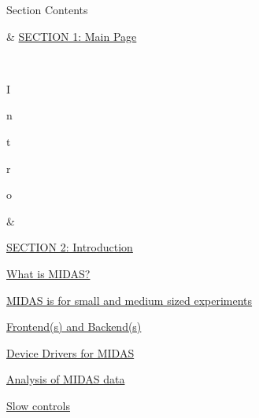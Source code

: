  \par
\par


\label{O_Contents_Page_Main_section_index}
\hypertarget{O_Contents_Page_Main_section_index}{}


\par
 \begin{TabularC}{2}
\hline
Section Contents   \\


\begin{TabularC}{2}
\hline
\par
 & \hyperlink{index_Top}{SECTION 1: Main Page} \par
  \\
 \par
\par
\par
I\par
n\par
t\par
r\par
o\par
   &\label{O_Contents_Page_Intro_section_index}
\hypertarget{O_Contents_Page_Intro_section_index}{}
 \par
 \hyperlink{Intro}{SECTION 2: Introduction} 
\begin{DoxyItemize}
\item \hyperlink{Intro_I_WhatIsMidas}{What is MIDAS?} 
\item \hyperlink{Intro_I_Midas_exp}{MIDAS is for small and medium sized experiments} 
\begin{DoxyItemize}
\item \hyperlink{Intro_I_FE_and_BE}{Frontend(s) and Backend(s)} 
\item \hyperlink{Intro_I_device_drivers}{Device Drivers for MIDAS} 
\item \hyperlink{Intro_I_Analysis}{Analysis of MIDAS data} 
\item \hyperlink{Intro_I_slow_controls}{Slow controls} 
\end{DoxyItemize}\par
 

\end{DoxyItemize}
\end{TabularC}
\end{TabularC}
